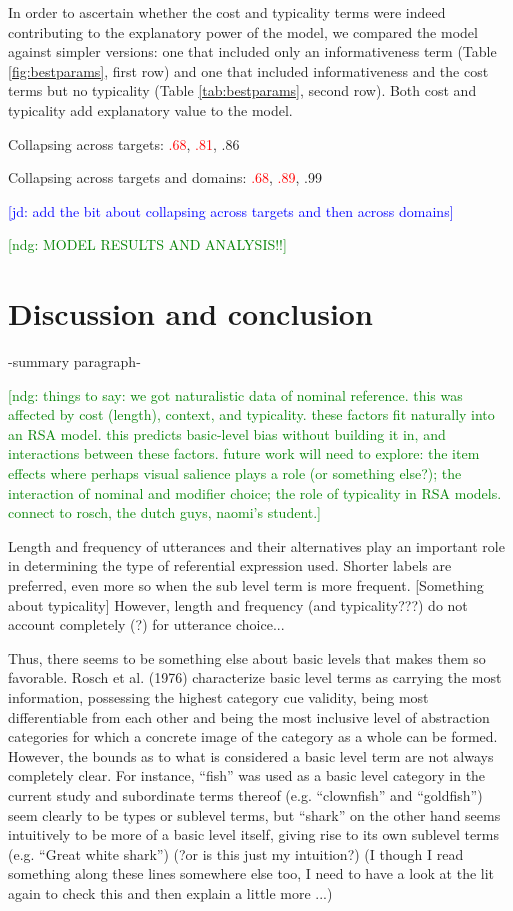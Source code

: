\documentclass[10pt,letterpaper]{article}
\newcommand{\red}[1]{\textcolor{Red}{#1}}
\newcommand{\ndg}[1]{\textcolor{Green}{[ndg: #1]}}
\newcommand{\jd}[1]{\textcolor{Blue}{[jd: #1]}}
\newcommand{\tableref}[1]{Table \ref{#1}}
\begin{document}
In order to ascertain whether the cost and typicality terms were indeed contributing to the explanatory power of the model, we compared the model against simpler versions: one that included only an informativeness term (\tableref{fig:bestparams}, first row) and one that included informativeness and the cost terms but no typicality (\tableref{tab:bestparams}, second row). Both cost and typicality add explanatory value to the model.

Collapsing across targets: \red{.68}, \red{.81}, .86

Collapsing across targets and domains: \red{.68}, \red{.89}, .99

\jd{add the bit about collapsing across targets and then across domains}

\ndg{MODEL RESULTS AND ANALYSIS!!}


\section{\bf Discussion and conclusion}

-summary paragraph- 

\ndg{things to say: we got naturalistic data of nominal reference. this was affected by cost (length), context, and typicality. these factors fit naturally into an RSA model. this predicts basic-level bias without building it in, and interactions between these factors. future work will need to explore: the item effects where perhaps visual salience plays a role (or something else?); the interaction of nominal and modifier choice; the role of typicality in RSA models. connect to rosch, the dutch guys, naomi's student.}

Length and frequency of utterances and their alternatives play an important role in determining the type of referential expression used. Shorter labels are preferred, even more so when the sub level term is more frequent. [Something about typicality] However, length and frequency (and typicality???) do not account completely (?) for utterance choice...

Thus, there seems to be something else about basic levels that makes them so favorable. Rosch et al. (1976) characterize basic level terms as carrying the most information, possessing the highest category cue validity, being most differentiable from each other and being the most inclusive level of abstraction categories for which a concrete image of the category as a whole can be formed. However, the bounds as to what is considered a basic level term are not always completely clear. For instance, ``fish'' was used as a basic level category in the current study and subordinate terms thereof (e.g. ``clownfish'' and ``goldfish'') seem clearly to be types or sublevel terms, but ``shark'' on the other hand seems intuitively to be more of a basic level itself, giving rise to its own sublevel terms (e.g. ``Great white shark'') (?or is this just my intuition?) (I though I read something along these lines somewhere else too, I need to have a look at the lit again to check this and then explain a little more ...)
\end{document}
